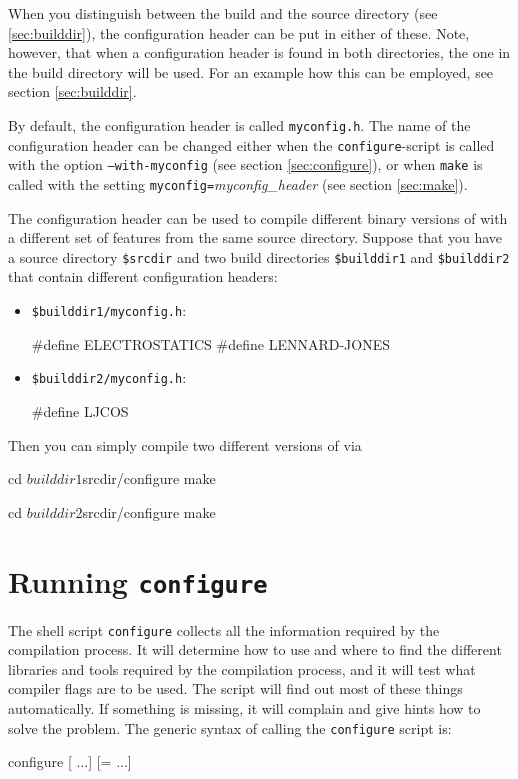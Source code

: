 When you distinguish between the build and the source directory (see
\vref{sec:builddir}), the configuration header can be put in either of
these. Note, however, that when a configuration header is found in
both directories, the one in the build directory will be used.  For an
example how this can be employed, see section \ref{sec:builddir}.

By default, the configuration header is called \texttt{myconfig.h}.
The name of the configuration header can be changed either when the
\texttt{configure}-script is called with the option
\mbox{\texttt{--with-myconfig}} (see section \vref{sec:configure}), or
when \texttt{make} is called with the setting
\mbox{\texttt{myconfig=}\textit{myconfig\_header}} (see section
\vref{sec:make}).

The configuration header can be used to compile different binary
versions of \es with a different set of features from the same source
directory.  Suppose that you have a source directory \texttt{\$srcdir}
and two build directories \texttt{\$builddir1} and
\texttt{\$builddir2} that contain different configuration headers:

\begin{itemize}
\item \texttt{\$builddir1/myconfig.h}:
\begin{code}
#define ELECTROSTATICS
#define LENNARD-JONES
\end{code}

\item \texttt{\$builddir2/myconfig.h}:
\begin{code}
#define LJCOS
\end{code}
\end{itemize}

\noindent Then you can simply compile two different versions of \es via
\begin{code}
cd $builddir1
$srcdir/configure
make

cd $builddir2
$srcdir/configure
make
\end{code}


\section{Running \texttt{configure}}
\label{sec:configure}


 The shell script \texttt{configure} collects all the
information required by the compilation process. It will determine how
to use and where to find the different libraries and tools required by
the compilation process, and it will test what compiler flags are to
be used.  The script will find out most of these things automatically.
If something is missing, it will complain and give hints how to solve
the problem.  The generic syntax of calling the \texttt{configure}
script is:
\begin{code}
configure [ ...] [= ...]
\end{code}

